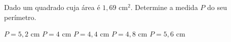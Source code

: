 Dado um quadrado cuja área é $1{,}69$ cm$^2$. Determine a medida $P$ do seu perímetro.

$P=5{,}2$ cm
$P=4$ cm
$P=4{,}4$ cm
$P=4{,}8$ cm
$P=5{,}6$ cm


